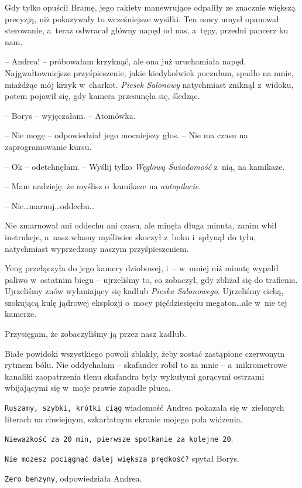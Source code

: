 \documentclass[oneside,polish,11pt,sfheadings]{mwbk}
\begin{document}
Gdy tylko opuścił Bramę, jego rakiety manewrujące odpaliły ze znacznie
większą precyzją, niż pokazywały to wcześniejsze wysiłki. Ten nowy umysł
opanował sterowanie, a~teraz odwracał główny napęd od nas, a~tępy,
przedni pancerz ku nam.

-- Andrea! -- próbowałam krzyknąć, ale ona już uruchamiała napęd.
Najgwałtowniejsze przyśpieszenie, jakie kiedykolwiek poczułam, spadło na
mnie, miażdżąc mój krzyk w~charkot. \textit{Piesek Salonowy} natychmiast
zniknął z~widoku, potem pojawił się, gdy kamera przesunęła się, śledząc.

-- Borys -- wyjęczałam. -- Atomówka.

-- Nie mogę -- odpowiedział jego mocniejszy głos. -- Nie ma czasu na
zaprogramowanie kursu.

-- Ok -- odetchnęłam. -- Wyślij tylko \textit{Węglową Świadomość} z~nią, na
kamikaze.

-- Mam nadzieję, że myślisz o~kamikaze na \textit{autopilocie}.

-- Nie\ldots  marnuj\ldots  oddechu\ldots 

Nie zmarnował ani oddechu ani czasu, ale minęła długa minuta, zanim wbił
instrukcje, a~nasz własny myśliwiec skoczył z~boku i~spłynął do tyłu,
natychmiast wyprzedzony naszym przyśpieszeniem.

Yeng przełączyła do jego kamery dziobowej, i~-- w~mniej niż minutę
wypalił paliwo w~ostatnim biegu -- ujrzeliśmy to, co zobaczył, gdy
zbliżał się do trafienia. Ujrzeliśmy znów wyłaniający się kadłub
\textit{Pieska Salonowego}. Ujrzeliśmy cichą, szokującą kulę jądrowej
eksplozji o~mocy pięćdziesięciu megaton\ldots  ale w~nie tej kamerze.

Przysięgam, że zobaczyliśmy ją przez nasz kadłub.

Białe powidoki wszystkiego powoli zblakły, żeby zostać zastąpione
czerwonym rytmem bólu. Nie oddychałam -- skafander robił to za mnie -- a~mikrometrowe kanaliki zaopatrzenia tlenu skafandra były wykutymi
gorącymi ostrzami wbijającymi się w~moje prawie zapadłe płuca.

\texttt{Ruszamy, szybki, krótki ciąg} wiadomość Andrea pokazała się w~zielonych literach na chwiejnym, szkarłatnym ekranie mojego pola
widzenia. 

\texttt{Nieważkość za 20 min, pierwsze spotkanie za kolejne 20}.

\texttt{Nie możesz pociągnąć dalej większa prędkość?} spytał Borys.

\texttt{Zero benzyny}, odpowiedziała Andrea.
\end{document}
